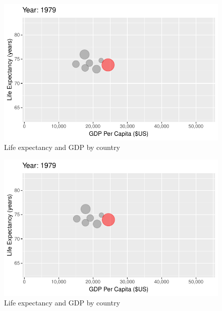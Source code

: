 \documentclass[
  letterpaper,
  DIV=11,
  numbers=noendperiod]{scrreport}
\theoremstyle{definition}
\theoremstyle{remark}
\begin{document}
\begin{figure}

{\centering \includegraphics{index_files/figure-pdf/fig-anim-country-49.pdf}

}

\caption{\label{fig-anim-country-49}Life expectancy and GDP by country}

\end{figure}

\begin{figure}

{\centering \includegraphics{index_files/figure-pdf/fig-anim-country-50.pdf}

}

\caption{\label{fig-anim-country-50}Life expectancy and GDP by country}

\end{figure}
\end{document}
